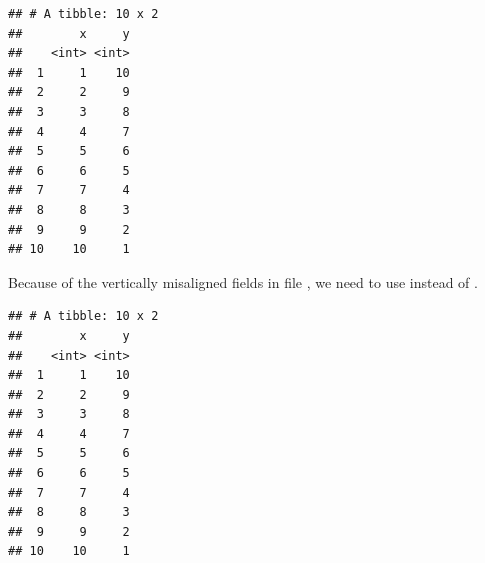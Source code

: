\documentclass[krantz2]{krantz}\usepackage{knitr}%
\begin{document}
\begin{knitrout}\footnotesize
{}\color{fgcolor}\begin{kframe}
\begin{alltt}
\hlstd{(} \hlstd{=} \hlstd{)}
\end{alltt}


{\ttfamily\noindent\itshape\color{messagecolor}{\#\# Using ',' as decimal and '.' as grouping mark. Use read\_delim() for more control.}}

{\ttfamily\noindent\itshape\color{messagecolor}{\#\# Parsed with column specification:\\\#\# cols(\\\#\#\ \  x = col\_integer(),\\\#\#\ \  y = col\_integer()\\\#\# )}}\begin{verbatim}
## # A tibble: 10 x 2
##        x     y
##    <int> <int>
##  1     1    10
##  2     2     9
##  3     3     8
##  4     4     7
##  5     5     6
##  6     6     5
##  7     7     4
##  8     8     3
##  9     9     2
## 10    10     1
\end{verbatim}
\end{kframe}
\end{knitrout}

Because of the vertically misaligned fields in file , we need to use  instead of .
\begin{knitrout}\footnotesize
{}\color{fgcolor}\begin{kframe}
\begin{alltt}
\hlstd{(} \hlstd{=} \hlstd{,} \hlstd{)}
\end{alltt}


{\ttfamily\noindent\itshape\color{messagecolor}{\#\# Parsed with column specification:\\\#\# cols(\\\#\#\ \  x = col\_integer(),\\\#\#\ \  y = col\_integer()\\\#\# )}}\begin{verbatim}
## # A tibble: 10 x 2
##        x     y
##    <int> <int>
##  1     1    10
##  2     2     9
##  3     3     8
##  4     4     7
##  5     5     6
##  6     6     5
##  7     7     4
##  8     8     3
##  9     9     2
## 10    10     1
\end{verbatim}
\end{kframe}
\end{knitrout}
\end{document}
